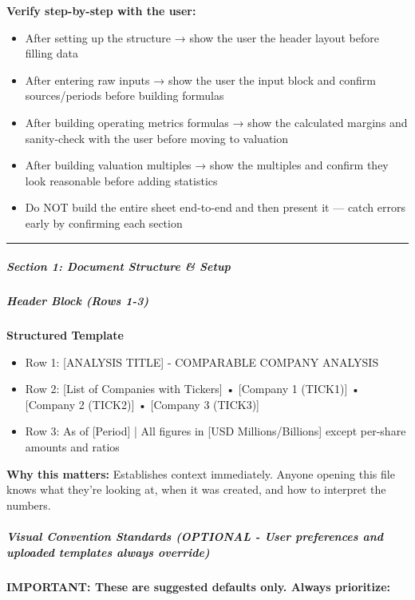 \documentclass[11pt]{article}
\begin{document}
\textbf{Verify step-by-step with the user:}

\begin{itemize}[leftmargin=*,itemsep=2pt,topsep=2pt]
\item {} After setting up the structure → show the user the header layout before filling data
\item {} After entering raw inputs → show the user the input block and confirm sources/periods before building formulas
\item {} After building operating metrics formulas → show the calculated margins and sanity-check with the user before moving to valuation
\item {} After building valuation multiples → show the multiples and confirm they look reasonable before adding statistics
\item {} Do NOT build the entire sheet end-to-end and then present it — catch errors early by confirming each section
\end{itemize}

\vspace{0.5em}\hrule\vspace{0.5em}

\subparagraph{Section 1: Document Structure \& Setup}\mbox{}\par

\subparagraph{Header Block (Rows 1-3)}\mbox{}\par
\textbf{Structured Template}
\begin{itemize}[leftmargin=*,itemsep=2pt,topsep=2pt]
\item {} Row 1: [ANALYSIS TITLE] - COMPARABLE COMPANY ANALYSIS
\item {} Row 2: [List of Companies with Tickers] • [Company 1 (TICK1)] • [Company 2 (TICK2)] • [Company 3 (TICK3)]
\item {} Row 3: As of [Period] | All figures in [USD Millions/Billions] except per-share amounts and ratios
\end{itemize}

\textbf{Why this matters:} Establishes context immediately. Anyone opening this file knows what they're looking at, when it was created, and how to interpret the numbers.


\subparagraph{Visual Convention Standards (OPTIONAL - User preferences and uploaded templates always override)}\mbox{}\par

\textbf{IMPORTANT: These are suggested defaults only. Always prioritize:}
\end{document}
